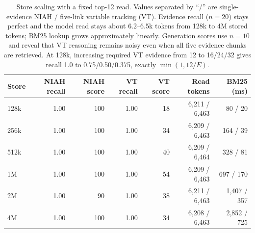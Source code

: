 \begin{table}[t]
\centering
\small
\setlength{\tabcolsep}{4pt}
\begin{tabular}{@{}lrrrrrr@{}}
\toprule
\textbf{Store} & \textbf{NIAH recall} & \textbf{NIAH score} & \textbf{VT recall} & \textbf{VT score} & \textbf{Read tokens} & \textbf{BM25 (ms)} \\
\midrule
128k & 1.00 & 100 & 1.00 & 18 & 6,211 / 6,463 & 80 / 20 \\
256k & 1.00 & 100 & 1.00 & 34 & 6,209 / 6,463 & 164 / 39 \\
512k & 1.00 & 100 & 1.00 & 40 & 6,209 / 6,464 & 328 / 81 \\
1M   & 1.00 & 100 & 1.00 & 54 & 6,209 / 6,463 & 697 / 170 \\
2M   & 1.00 & 90  & 1.00 & 38 & 6,211 / 6,463 & 1,407 / 357 \\
4M   & 1.00 & 100 & 1.00 & 34 & 6,208 / 6,463 & 2,852 / 725 \\
\bottomrule
\end{tabular}
\caption{Store scaling with a fixed top-12 read. Values separated by ``/'' are
single-evidence NIAH / five-link variable tracking (VT). Evidence recall
($n{=}20$) stays perfect and the model read stays about 6.2--6.5k tokens from
128k to 4M stored tokens; BM25 lookup grows approximately linearly. Generation
scores use $n{=}10$ and reveal that VT reasoning remains noisy even when all
five evidence chunks are retrieved. At 128k, increasing required VT evidence
from 12 to 16/24/32 gives recall 1.0 to 0.75/0.50/0.375, exactly
$\min(1,12/E)$.}
\label{tab:store-scaling}
\end{table}
